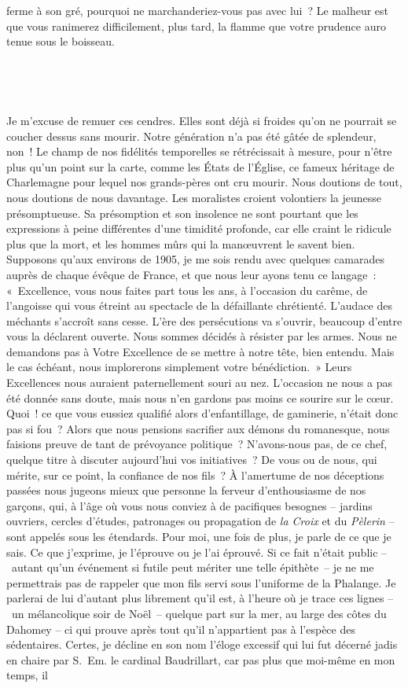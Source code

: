 \documentclass[french,twoside]{book} %
\newcommand{\astertri}{\medskip\par\centerline{\color{rubric}\large\selectfont{\syms ✻\,✻\,✻}}\medskip\par}%
\begin{document}
ferme à son gré, pourquoi ne marchanderiez-vous pas avec lui ? Le malheur est que vous ranimerez difficilement, plus tard, la flamme que votre prudence auro tenue sous le boisseau.\par
 \par

\astertri

\noindent  \par
Je m’excuse de remuer ces cendres. Elles sont déjà si froides qu’on ne pourrait se coucher dessus sans mourir. Notre génération n’a pas été gâtée de splendeur, non ! Le champ de nos fidélités temporelles se rétrécissait à mesure, pour n’être plus qu’un point sur la carte, comme les États de l’Église, ce fameux héritage de Charlemagne pour lequel nos grands-pères ont cru mourir. Nous doutions de tout, nous doutions de nous davantage. Les moralistes croient volontiers la jeunesse présomptueuse. Sa présomption et son insolence ne sont pourtant que les expressions à peine différentes d’une timidité profonde, car elle craint le ridicule plus que la mort, et les hommes mûrs qui la manœuvrent le savent bien. Supposons qu’aux environs de 1905, je me sois rendu avec quelques camarades auprès de chaque évêque de France, et que nous leur ayons tenu ce langage : « Excellence, vous nous faites part tous les ans, à l’occasion du carême, de l’angoisse qui vous étreint au spectacle de la défaillante chrétienté. L’audace des méchants s’accroît sans cesse. L’ère des persécutions va s’ouvrir, beaucoup d’entre vous la déclarent ouverte. Nous sommes décidés à résister par les armes. Nous ne demandons pas à Votre Excellence de se mettre à notre tête, bien entendu. Mais le cas échéant, nous implorerons simplement votre bénédiction. » Leurs Excellences nous auraient paternellement souri au nez. L’occasion ne nous a pas été donnée sans doute, mais nous n’en gardons pas moins ce sourire sur le cœur. Quoi ! ce que vous eussiez qualifié alors d’enfantillage, de gaminerie, n’était donc pas si fou ? Alors que nous pensions sacrifier aux démons du romanesque, nous faisions preuve de tant de prévoyance politique ? N’avons-nous pas, de ce chef, quelque titre à discuter aujourd’hui vos initiatives ? De vous ou de nous, qui mérite, sur ce point, la confiance de nos fils ? À l’amertume de nos déceptions passées nous jugeons mieux que personne la ferveur d’enthousiasme de nos garçons, qui, à l’âge où vous nous conviez à de pacifiques besognes – jardins ouvriers, cercles d’études, patronages ou propagation de \emph{la Croix} et du \emph{Pèlerin} – sont appelés sous les étendards. Pour moi, une fois de plus, je parle de ce que je sais. Ce que j’exprime, je l’éprouve ou je l’ai éprouvé. Si ce fait n’était public – autant qu’un événement si futile peut mériter une telle épithète – je ne me permettrais pas de rappeler que mon fils servi sous l’uniforme de la Phalange. Je parlerai de lui d’autant plus librement qu’il est, à l’heure où je trace ces lignes – un mélancolique soir de Noël – quelque part sur la mer, au large des côtes du Dahomey – ci qui prouve après tout qu’il n’appartient pas à l’espèce des sédentaires. Certes, je décline en son nom l’éloge excessif qui lui fut décerné jadis en chaire par S. Em. le cardinal Baudrillart, car pas plus que moi-même en mon temps, il 
\end{document}
